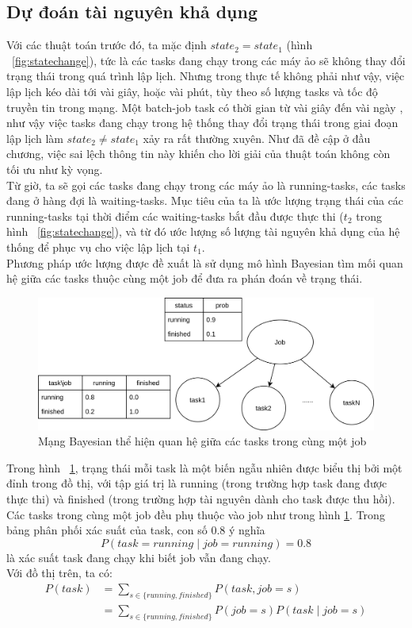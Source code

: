 \documentclass{my_style}
\begin{document}
\subsection{Dự đoán tài nguyên khả dụng}
Với các thuật toán trước đó, ta mặc định $state_{2} = state_{1}$ (hình ~\ref{fig:statechange}), tức là các tasks đang chạy trong các máy ảo sẽ không thay đổi trạng thái trong quá trình lập lịch. Nhưng trong thực tế không phải như vậy, việc lập lịch kéo dài tới vài giây, hoặc vài phút, tùy theo số lượng tasks và tốc độ truyền tin trong mạng. Một batch-job task có thời gian từ vài giây đến vài ngày \cite{17}\cite{18}, như vậy việc tasks đang chạy trong hệ thống thay đổi trạng thái trong giai đoạn lập lịch làm $state_{2} \neq state_{1}$ xảy ra rất thường xuyên. Như đã đề cập ở đầu chương, việc sai lệch thông tin này khiến cho lời giải của thuật toán không còn tối ưu như kỳ vọng. \\
Từ giờ, ta sẽ gọi các tasks đang chạy trong các máy ảo là running-tasks, các tasks đang ở hàng đợi là waiting-tasks. Mục tiêu của ta là ước lượng trạng thái của các running-tasks tại thời điểm các waiting-tasks bắt đầu được thực thi ($t_{2}$ trong hình ~\ref{fig:statechange}), và từ đó ước lượng số lượng tài nguyên khả dụng của hệ thống để phục vụ cho việc lập lịch tại $t_{1}$. \\
Phương pháp ước lượng được đề xuất là sử dụng mô hình Bayesian tìm mối quan hệ giữa các tasks thuộc cùng một job để đưa ra phán đoán về trạng thái. 
\begin{figure}[h!]
	\centering 
	\includegraphics[scale=0.6]{images/job_network.png}
	\caption{Mạng Bayesian thể hiện quan hệ giữa các tasks trong cùng một job}
	\label{fig:job_network}
\end{figure}
Trong hình ~\ref{fig:job_network}, trạng thái mỗi task là một biến ngẫu nhiên được biểu thị bởi một đỉnh trong đồ thị, với tập giá trị là running (trong trường hợp task đang được thực thi) và finished (trong trường hợp tài nguyên dành cho task được thu hồi). Các tasks trong cùng một job đều phụ thuộc vào job như trong hình \ref{fig:job_network}. Trong bảng phân phối xác suất của task, con số 0.8 ý nghĩa
\[
 P(task = running \mid job = running) = 0.8
\]
là xác suất task đang chạy khi biết job vẫn đang chạy. \\
Với đồ thị trên, ta có: 
\begin{align*}
	P(task) &= \sum_{s \in \{running, finished\}}P(task, job = s) \\
			&= \sum_{s \in \{running, finished\}}P(job = s)P(task \mid job = s)
\end{align*}
\end{document}
